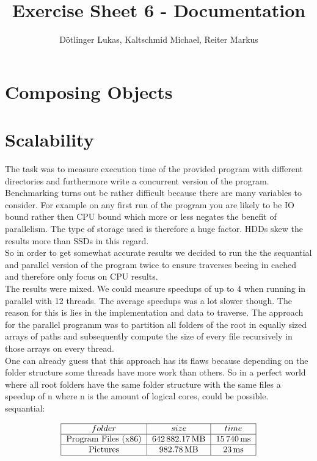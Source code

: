 \documentclass{article}
\title{Exercise Sheet 6 - Documentation}
\date{}
\author{Dötlinger Lukas, Kaltschmid Michael, Reiter Markus}
\begin{document}
  \RaggedRight

  \maketitle

  \section{Composing Objects}

  \section{Scalability}
    The task was to measure execution time of the provided program with different directories and furthermore write a concurrent version of the program.
    \\[3pt]
    Benchmarking turns out be rather difficult because there are many variables to consider. For example on any first run of the program you are likely to be IO bound rather then CPU bound which more or less negates the benefit of parallelism. The type of storage used is therefore a huge factor. HDDs skew the results more than SSDs in this regard.
    \\[3pt]
    So in order to get somewhat accurate results we decided to run the the sequantial and parallel version of the program twice to ensure traverses beeing in cached and therefore only focus on CPU results.
    \\[3pt]
    The results were mixed. We could measure speedups of up to 4 when running in parallel with 12 threads. The average speedups was a lot slower though. The reason for this is lies in the implementation and data to traverse. The approach for the parallel programm was to partition all folders of the root in equally sized arrays of paths and subsequently compute the size of every file recursively in those arrays on every thread.
    \\[3pt]
    One can already guess that this approach has its flaws because depending on the folder structure some threads have more work than others. So in a perfect world where all root folders have the same folder structure with the same files a speedup of n where n is the amount of logical cores, could be possible.
    \\[24pt]
    sequantial:
    \begin{doublespacing}
      \begin{align*}
        \begin{tabular}{|*{3}{c|}}
          \hline
          $folder$ & $size$ & $time$ \\
          \hline
          Program Files (x86) & $\SI{642882.17}{\mega\byte}$ & $\SI{15740}{\milli\second}$ \\
          \hline
          Pictures & $\SI{982.78}{\mega\byte}$ & $\SI{23}{\milli\second}$ \\
          \hline
        \end{tabular}
      \end{align*}
    \end{doublespacing}
\end{document}
